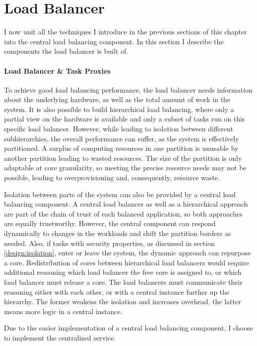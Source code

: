 \section{Load Balancer}
\label{design:balancer}

I now unit all the techniques I introduce in the previous sections of this chapter
into the central load balancing component.
In this section I describe the components the load balancer is built of.


\paragraph{Load Balancer \& Task Proxies}
To achieve good load balancing performance, the load balancer needs information
about the underlying hardware, as well as the total amount of work in the system.
It is also possible to build hierarchical load balancing, where
only a partial view on the hardware is available and only a subset of tasks run
on this specific load balancer.
However, while leading to isolation between different subhierarchies,
the overall performance can suffer, as the system is effectively partitioned.
A surplus of computing resources in one partition is unusable by another
partition leading to wasted resources.
The size of the partition is only adaptable at core granularity, so meeting the
precise resource needs may not be possible, leading to overprovisioning and,
consequently, resource waste.

Isolation between parts of the system can also be provided by a central load
balancing component.
A central load balancer as well as a hierarchical approach are part of the chain
of trust of each balanced application, so both approaches are equally
trustworthy.
However, the central component can respond dynamically to changes in the workloads and
shift the partition borders as needed.
Also, if tasks with security properties, as discussed in section
\ref{design:isolation}, enter or leave the system, the dynamic approach can
repurpose a core.
Redistribution of cores between hierarchical load balancers would require
additional reasoning which load balancer the free core is assigned to, or which
load balancer must release a core.
The load balancers must communicate their reasoning either with each other, or
with a central instance further up the hierarchy.
The former weakens the isolation and increases overhead, the latter means more
logic in a central instance.

Due to the easier implementation of a central load balancing component,
I choose to implement the centralized service.
\\

